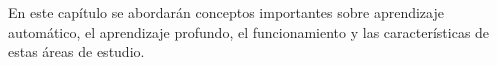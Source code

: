 En este capítulo se abordarán conceptos importantes sobre aprendizaje automático, el aprendizaje profundo, el funcionamiento y las características de estas áreas de estudio.


